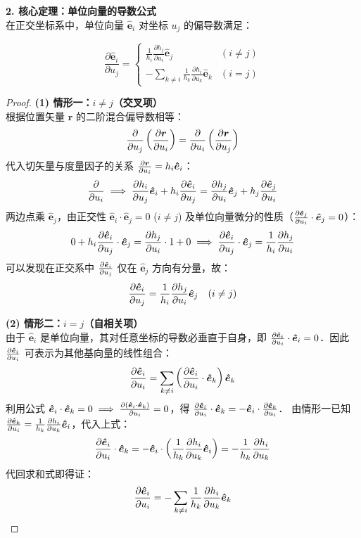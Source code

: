 \documentclass[12pt, a4paper, oneside, UTF8]{ctexbook}
\begin{document}
\noindent \textbf{2. 核心定理：单位向量的导数公式} \\
在正交坐标系中，单位向量 $\bm{\hat{e}}_i$ 对坐标 $u_j$ 的偏导数满足：
\begin{theorem}
    \[ \frac{\partial \bm{\hat{e}}_i}{\partial u_j} = \begin{cases} 
        \displaystyle \frac{1}{h_i} \frac{\partial h_j}{\partial u_i} \bm{\hat{e}}_j & (i \neq j) \\[2ex]
        \displaystyle -\sum_{k \neq i} \frac{1}{h_k} \frac{\partial h_i}{\partial u_k} \bm{\hat{e}}_k & (i = j) 
    \end{cases} \]
\end{theorem}

\begin{proof}
    \noindent \textbf{(1) 情形一：$i \neq j$（交叉项）} \\
根据位置矢量 $\bm{r}$ 的二阶混合偏导数相等：
\[ \pdv{}{u_j} \left( \pdv{\bm{r}}{u_i} \right) = \pdv{}{u_i} \left( \pdv{\bm{r}}{u_j} \right) \]
代入切矢量与度量因子的关系 $\pdv{\bm{r}}{u_i} = h_i \bm{\hat{e}}_i$：
\[\pdv{}{u_i} (h_j \bm{\hat{e}}_j) \implies \pdv{h_i}{u_j} \bm{\hat{e}}_i + h_i \pdv{\bm{\hat{e}}_i}{u_j} = \pdv{h_j}{u_i} \bm{\hat{e}}_j + h_j \pdv{\bm{\hat{e}}_j}{u_i} \]
两边点乘 $\bm{\hat{e}}_j$，由正交性 $\bm{\hat{e}}_i \cdot \bm{\hat{e}}_j = 0$ ($i \neq j$) 及单位向量微分的性质（$\pdv{\bm{\hat{e}}_j}{u_i} \cdot \bm{\hat{e}}_j = 0$）：
\[ 0 + h_i \pdv{\bm{\hat{e}}_i}{u_j} \cdot \bm{\hat{e}}_j = \pdv{h_j}{u_i} \cdot 1 + 0 \implies \pdv{\bm{\hat{e}}_i}{u_j} \cdot \bm{\hat{e}}_j = \frac{1}{h_i} \pdv{h_j}{u_i} \]
可以发现在正交系中 $\pdv{\bm{\hat{e}}_i}{u_j}$ 仅在 $\bm{\hat{e}}_j$ 方向有分量，故：
\[ \pdv{\bm{\hat{e}}_i}{u_j} = \frac{1}{h_i} \pdv{h_j}{u_i} \bm{\hat{e}}_j \quad (i \neq j) \]

\noindent \textbf{(2) 情形二：$i = j$（自相关项）} \\
由于 $\bm{\hat{e}}_i$ 是单位向量，其对任意坐标的导数必垂直于自身，即 $\pdv{\bm{\hat{e}}_i}{u_i} \cdot \bm{\hat{e}}_i = 0$．因此 $\pdv{\bm{\hat{e}}_i}{u_i}$ 可表示为其他基向量的线性组合：
\[ \pdv{\bm{\hat{e}}_i}{u_i} = \sum_{k \neq i} \left( \pdv{\bm{\hat{e}}_i}{u_i} \cdot \bm{\hat{e}}_k \right) \bm{\hat{e}}_k \]
利用公式 $\bm{\hat{e}}_i \cdot \bm{\hat{e}}_k = 0 \implies \pdv{(\bm{\hat{e}}_i \cdot \bm{\hat{e}}_k)}{u_i} = 0$，得 $\pdv{\bm{\hat{e}}_i}{u_i} \cdot \bm{\hat{e}}_k = -\bm{\hat{e}}_i \cdot \pdv{\bm{\hat{e}}_k}{u_i}$．
由情形一已知 $\pdv{\bm{\hat{e}}_k}{u_i} = \frac{1}{h_k} \pdv{h_i}{u_k} \bm{\hat{e}}_i$，代入上式：
\[ \pdv{\bm{\hat{e}}_i}{u_i} \cdot \bm{\hat{e}}_k = -\bm{\hat{e}}_i \cdot \left( \frac{1}{h_k} \pdv{h_i}{u_k} \bm{\hat{e}}_i \right) = -\frac{1}{h_k} \pdv{h_i}{u_k} \]
代回求和式即得证：
\[ \pdv{\bm{\hat{e}}_i}{u_i} = -\sum_{k \neq i} \frac{1}{h_k} \pdv{h_i}{u_k} \bm{\hat{e}}_k \]
\end{proof}
\end{document}
